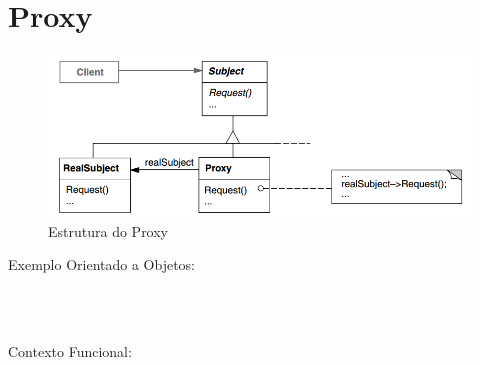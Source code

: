 \section{Proxy}

\begin{figure}[htb]
	\caption{\label{proxy_struct}Estrutura do Proxy}
	\begin{center}
	    \includegraphics[scale=0.5]{5_padroes-contexto-funcional/5.2_estruturais/5.2.7_proxy/diagram.png}
	\end{center}
\end{figure}

Exemplo Orientado a Objetos:

\begin{lstlisting}[caption={Proxy Orientado a Objetos},label=ooproxy]



\end{lstlisting}

Contexto Funcional:


\begin{lstlisting}[caption={Proxy Funcional},label=fpproxy]
    

    
\end{lstlisting}